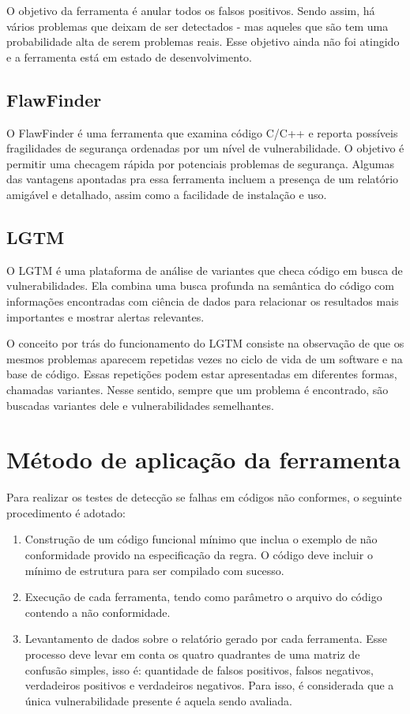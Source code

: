 O objetivo da ferramenta é anular todos os falsos positivos. Sendo assim, há vários problemas que deixam de ser detectados - mas aqueles que são tem uma probabilidade alta de serem problemas reais. Esse objetivo ainda não foi atingido e a ferramenta está em estado de desenvolvimento.

\subsection{FlawFinder}

O FlawFinder \cite{flawfinder} é uma ferramenta que examina código C/C++ e reporta possíveis fragilidades de segurança ordenadas por um nível de vulnerabilidade. O objetivo é permitir uma checagem rápida por potenciais problemas de segurança. Algumas das vantagens apontadas pra essa ferramenta incluem a presença de um relatório amigável e detalhado, assim como a facilidade de instalação e uso.

\subsection{LGTM}

O LGTM \cite{lgtm} é uma plataforma de análise de variantes que checa código em busca de vulnerabilidades. Ela combina uma busca profunda na semântica do código com informações encontradas com ciência de dados para relacionar os resultados mais importantes e mostrar alertas relevantes.

O conceito por trás do funcionamento do LGTM consiste na observação de que os mesmos problemas aparecem repetidas vezes no ciclo de vida de um software e na base de código. Essas repetições podem estar apresentadas em diferentes formas, chamadas variantes. Nesse sentido, sempre que um problema é encontrado, são buscadas variantes dele e vulnerabilidades semelhantes.

\section{Método de aplicação da ferramenta}

Para realizar os testes de detecção se falhas em códigos não conformes, o seguinte procedimento é adotado:

\begin{enumerate}
  \item Construção de um código funcional mínimo que inclua o exemplo de não conformidade provido na especificação da regra. O código deve incluir o mínimo de estrutura para ser compilado com sucesso.
  \item Execução de cada ferramenta, tendo como parâmetro o arquivo do código contendo a não conformidade.
  \item Levantamento de dados sobre o relatório gerado por cada ferramenta. Esse processo deve levar em conta os quatro quadrantes de uma matriz de confusão simples, isso é: quantidade de falsos positivos, falsos negativos, verdadeiros positivos e verdadeiros negativos. Para isso, é considerada que a única vulnerabilidade presente é aquela sendo avaliada.
\end{enumerate}

